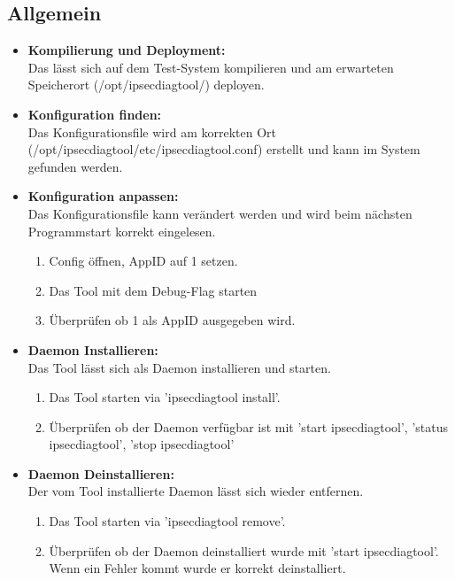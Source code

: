 \subsection{Allgemein}
\begin{itemize}
\item[\Square] \textbf{Kompilierung und Deployment:}\\
Das \tool lässt sich auf dem Test-System kompilieren und am erwarteten Speicherort (/opt/ipsecdiagtool/) deployen.
			   
\item[\Square] \textbf{Konfiguration finden:} \\
Das Konfigurationsfile wird am korrekten Ort (/opt/ipsecdiagtool/etc/ipsecdiagtool.conf) erstellt und kann im System gefunden werden. 
			   
\item[\Square] \textbf{Konfiguration anpassen:} \\
Das Konfigurationsfile kann verändert werden und wird beim nächsten Programmstart korrekt eingelesen.
\begin{enumerate} \itemsep1pt \parskip0pt 
  \item Config öffnen, AppID auf 1 setzen.
  \item Das Tool mit dem Debug-Flag starten
  \item Überprüfen ob 1 als AppID ausgegeben wird.
\end{enumerate}

\item[\Square] \textbf{Daemon Installieren:} \\
Das Tool lässt sich als Daemon installieren und starten.
\begin{enumerate} \itemsep1pt \parskip0pt 
  \item Das Tool starten via 'ipsecdiagtool install'.
  \item Überprüfen ob der Daemon verfügbar ist mit 'start ipsecdiagtool', 'status ipsecdiagtool', 'stop ipsecdiagtool'
\end{enumerate}

\item[\Square] \textbf{Daemon Deinstallieren:} \\
Der vom Tool installierte Daemon lässt sich wieder entfernen.
\begin{enumerate} \itemsep1pt \parskip0pt 
  \item Das Tool starten via 'ipsecdiagtool remove'.
  \item Überprüfen ob der Daemon deinstalliert wurde mit 'start ipsecdiagtool'. Wenn ein Fehler kommt wurde er korrekt deinstalliert.
\end{enumerate}
			   
\end{itemize}

